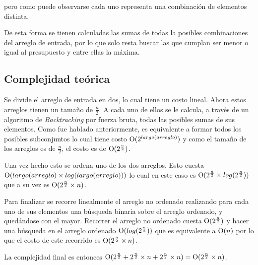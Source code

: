 pero como puede observarse cada uno representa una combinación de elementos
distinta.

De esta forma se tienen calculadas las sumas de todas la posibles combinaciones
del arreglo de entrada, por lo que solo resta buscar las que cumplan ser menor o
igual al presupuesto y entre ellas la máxima.


\subsection{Complejidad teórica}

Se divide el arreglo de entrada en dos, lo cual tiene un costo lineal. Ahora estos arreglos tienen un tamaño de $\frac{n}{2}$. A cada uno de ellos se le calcula, a través de un algoritmo de \textit{Backtracking} por fuerza bruta, todas las posibles sumas de sus elementos. Como fue hablado anteriormente, es equivalente a formar todos los posibles subconjuntos lo cual tiene costo $\operatorname{O}(2^{largo(arreglo)})$  y como el tamaño de los arreglos es de $\frac{n}{2}$, el costo es de $\operatorname{O}(2^{\frac{n}{2}})$.

Una vez hecho esto se ordena uno de los dos arreglos. Esto cuesta $\operatorname{O}(largo(arreglo) \times log(largo(arreglo)))$ lo cual en este caso es $\operatorname{O}(2^{\frac{n}{2}} \times log(2^{\frac{n}{2}}))$ que a su vez es $\operatorname{O}(2^{\frac{n}{2}} \times n)$.

Para finalizar se recorre linealmente el arreglo no ordenado realizando para cada uno de sus elementos una búsqueda binaria sobre el arreglo ordenado, y quedándose con el mayor. Recorrer el arreglo no ordenado cuesta $\operatorname{O}(2^{\frac{n}{2}})$ y hacer una búsqueda en el arreglo ordenado $\operatorname{O}(log(2^{\frac{n}{2}}))$ que es equivalente a $\operatorname{O}(n)$ por lo que el costo de este recorrido es $\operatorname{O}(2^{\frac{n}{2}} \times n)$.

La complejidad final es entonces $\operatorname{O}(2^{\frac{n}{2}} + 2^{\frac{n}{2}} \times n + 2^{\frac{n}{2}} \times n) = \operatorname{O}(2^{\frac{n}{2}} \times n)$.